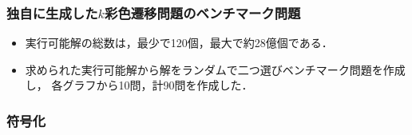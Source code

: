 \begin{frame}\frametitle{独自に生成した$k$彩色遷移問題のベンチマーク問題}

  \begin{table}[t]
    \centering
    
  \end{table}

  \begin{itemize}
  \item 実行可能解の総数は，最少で120個，最大で約28億個である．
  \item 求められた実行可能解から解をランダムで二つ選びベンチマーク問題を作成し，
        各グラフから10問，計90問を作成した．
  \end{itemize}

\end{frame}

\begin{frame}\frametitle{符号化}

  \begin{exampleblock}{}
    \centering
    
  \end{exampleblock}
  
\end{frame}

